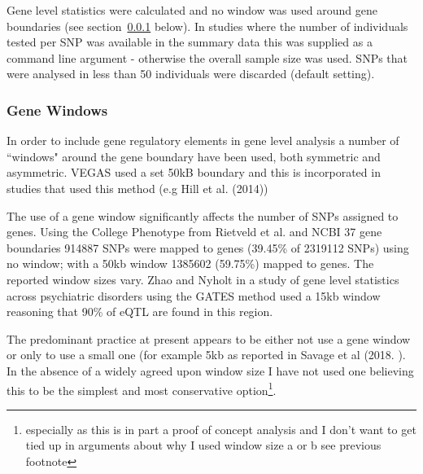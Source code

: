 Gene level statistics were calculated and no window was used around gene boundaries (see section~\ref{sec:Gene windows} below). In studies where the number of individuals tested per SNP was available in the summary data this was supplied as a command line argument - otherwise the overall sample size was used. SNPs that were analysed in less than 50 individuals were discarded (default setting). 

\subsubsection{Gene Windows}
\label{sec:Gene windows}
 In order to include gene regulatory elements in gene level analysis a number of ``windows"%
around the gene boundary have been used, both symmetric and asymmetric. VEGAS \cite{liu2010versatile} used a set 50kB boundary and this is incorporated in studies that used this method (e.g Hill et al. (2014)\cite{hill2014human})

The use of a gene window significantly affects the number of SNPs assigned to genes.  Using the College Phenotype from Rietveld et al. \cite{rietveld2013gwas} and NCBI 37 gene boundaries 914887 SNPs were mapped to genes (39.45\% of 2319112 SNPs) using no window; with a 50kb window 1385602 (59.75\%) mapped to genes.
The reported window sizes vary. Zhao and Nyholt \cite{zhao2017gene} in a study of gene level statistics across psychiatric disorders using the GATES method \cite{li2011gates}  used a 15kb window reasoning that 90\% \cite{pickrell2010understanding} of eQTL are found in this region. 

The predominant practice at present appears to be either not use a gene window or only to use a small one (for example 5kb as reported in Savage et al (2018. \cite{savage2018genome}). In the absence of a widely agreed upon window size I have not used one believing this to be the simplest and most conservative option\footnote{especially as this is in part a proof of concept analysis and I don't want to get tied up in arguments about why I used window size a or b see previous footnote}. 



